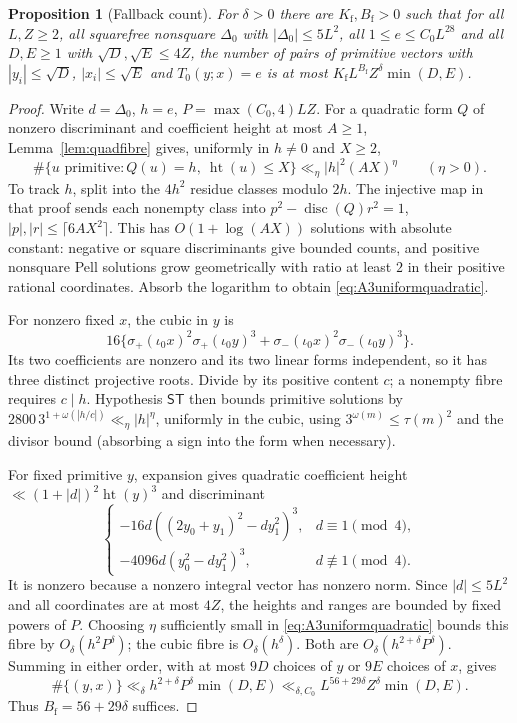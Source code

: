\documentclass[11pt,reqno]{amsart}
\newtheorem{proposition}[theorem]{Proposition}
\theoremstyle{definition}
\theoremstyle{remark}
\numberwithin{equation}{section}
\newcommand{\ST}{\mathsf{ST}}\newcommand{\CC}{\mathsf{CC}}\newcommand{\GE}{\mathsf{GE}}
\newcommand{\hgt}{\operatorname{ht}}
\begin{document}
\begin{proposition}[Fallback count]\label{prop:A3fallback}
For $\delta>0$ there are $K_{\mathrm f},B_{\mathrm f}>0$ such
that for all $L,Z\ge2$, all squarefree nonsquare $\Delta_0$ with
$|\Delta_0|\le5L^2$, all $1\le e\le C_0L^{28}$ and all $D,E\ge1$ with
$\sqrt D,\sqrt E\le4Z$, the number of pairs of primitive vectors with
$|y_i|\le\sqrt D$, $|x_i|\le\sqrt E$ and $T_0(y;x)=e$ is at most
$K_{\mathrm f}L^{B_{\mathrm f}}Z^{\delta}\min(D,E)$.
\end{proposition}
\begin{proof}
Write $d=\Delta_0$, $h=e$, $P=\max(C_0,4)LZ$.
For a quadratic form $Q$ of nonzero discriminant and coefficient
height at most $A\ge1$, Lemma~\ref{lem:quadfibre} gives, uniformly in
$h\ne0$ and $X\ge2$,
\begin{equation}\label{eq:A3uniformquadratic}
 \#\{u\text{ primitive}:Q(u)=h,\ \hgt(u)\le X\}
 \ll_\eta |h|^2(AX)^\eta\qquad(\eta>0).
\end{equation}
To track $h$, split into the $4h^2$ residue classes modulo $2h$.
The injective map in that proof sends each nonempty class into
$p^2-\operatorname{disc}(Q)r^2=1$, $|p|,|r|\le\lceil6AX^2\rceil$.
This has $O(1+\log(AX))$ solutions with absolute constant: negative or
square discriminants give bounded counts, and positive nonsquare Pell
solutions grow geometrically with ratio at least $2$ in their positive
rational coordinates. Absorb the logarithm to obtain \eqref{eq:A3uniformquadratic}.

For nonzero fixed $x$, the cubic in $y$ is
\[
 16\{\sigma_+(\iota_0x)^2\sigma_+(\iota_0y)^3+
       \sigma_-(\iota_0x)^2\sigma_-(\iota_0y)^3\}.
\]
Its two coefficients are nonzero and its two linear forms independent,
so it has three distinct projective roots. Divide by its positive
content $c$; a nonempty fibre requires $c\mid h$. Hypothesis $\ST$
then bounds primitive solutions by $2800\,3^{1+\omega(|h/c|)}
\ll_\eta|h|^\eta$, uniformly in the cubic, using
$3^{\omega(m)}\le\tau(m)^2$ and the divisor bound (absorbing a sign
into the form when necessary).

For fixed primitive $y$, expansion gives quadratic coefficient height
$\ll(1+|d|)^2\hgt(y)^3$ and discriminant
\[
 \begin{cases}
 -16d((2y_0+y_1)^2-dy_1^2)^3,&d\equiv1\pmod4,\\
 -4096d(y_0^2-dy_1^2)^3,&d\not\equiv1\pmod4.
 \end{cases}
\]
It is nonzero because a nonzero integral vector has nonzero norm.
Since $|d|\le5L^2$ and all coordinates are at most $4Z$, the heights
and ranges are bounded by fixed powers of $P$. Choosing $\eta$
sufficiently small in \eqref{eq:A3uniformquadratic} bounds this fibre
by $O_\delta(h^2P^\delta)$; the cubic fibre is $O_\delta(h^\delta)$.
Both are $O_\delta(h^{2+\delta}P^\delta)$. Summing in either order,
with at most $9D$ choices of $y$ or $9E$ choices of $x$, gives
\[
 \#\{(y,x)\}\ll_\delta h^{2+\delta}P^\delta\min(D,E)
 \ll_{\delta,C_0}L^{56+29\delta}Z^\delta\min(D,E).
\]
Thus $B_{\mathrm f}=56+29\delta$ suffices.
\end{proof}
\end{document}
